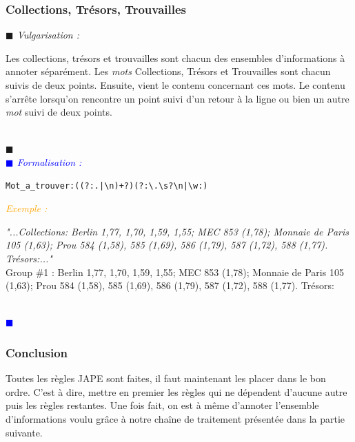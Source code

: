 \documentclass[a4paper, 11pt]{report}
\newenvironment{vulgarisation}
    {
    \textit{\textcolor{dark-blue}{$\blacksquare$  Vulgarisation : \\}}

    }
    {
    ~\\\textcolor{dark-blue}{$\blacksquare$}\\
    }
\newenvironment{formalisation}
    {
    \textit{\textcolor{blue}{$\blacksquare$  Formalisation : \\}}
    }
    {
    ~\\\textcolor{blue}{$\blacksquare$}\\
    }
\newenvironment{exemple}
    {
    \textit{\textcolor{orange}{
    Exemple : \\}}
    }
    {~\\
    }
\begin{document}
\subsubsection{Collections, Trésors, Trouvailles}
\begin{vulgarisation}
Les collections, trésors et trouvailles sont chacun des ensembles d'informations à annoter séparément.
    Les \textit{mots} Collections, Trésors et Trouvailles sont chacun suivis de deux points. Ensuite, vient le contenu concernant ces mots. Le contenu s'arrête lorsqu'on rencontre un point suivi d'un retour à la ligne ou bien un autre \textit{mot} suivi de deux points.
\end{vulgarisation}
\begin{formalisation}
    \begin{verbatim}
Mot_a_trouver:((?:.|\n)+?)(?:\.\s?\n|\w:)
    \end{verbatim}
    \begin{exemple}
        \emph{"...Collections: Berlin 1,77, 1,70, 1,59,
            1,55; MEC 853 (1,78); Monnaie de Paris 105 (1,63); Prou 584 (1,58), 585 (1,69), 586 (1,79), 587 
            (1,72), 588 (1,77). Trésors:..."}\\
        Group \#1 :  Berlin 1,77, 1,70, 1,59,
        1,55; MEC 853 (1,78); Monnaie de Paris 105 (1,63); Prou 584 (1,58), 585 (1,69), 586 (1,79), 587 (1,72), 588 (1,77). Trésors:
    \end{exemple}
\end{formalisation}

\subsubsection*{Conclusion}
Toutes les règles JAPE sont faites, il faut maintenant les placer dans le bon ordre. C'est à dire, mettre en premier les règles qui ne dépendent d'aucune autre puis les règles restantes. Une fois fait, on est à même d'annoter l'ensemble d'informations voulu grâce à notre chaîne de traitement présentée dans la partie suivante.
\end{document}
